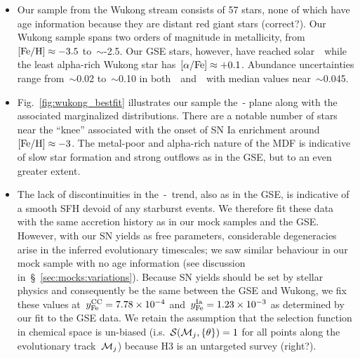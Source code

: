 \documentclass[ms.tex]{subfiles}
\begin{document}
\begin{itemize}

	\item Our sample from the Wukong stream consists of 57 stars, none of which
	have age information because they are distant red giant stars {\color{red}
	(correct?)}.
	Our Wukong sample spans two orders of magnitude in metallicity,
	from~$\text{[Fe/H]} \approx -3.5$ to~$\sim$-2.5.
	Our GSE stars, however, have reached solar~\afe~while the least alpha-rich
	Wukong star has~$\text{[$\alpha$/Fe]} \approx +0.1$.
	Abundance uncertainties range from~$\sim$0.02 to~$\sim$0.10 in
	both~\afe~and~\feh~with median values near~$\sim$0.045.

	\item Fig.~\ref{fig:wukong_bestfit} illustrates our sample the~\afe-\feh
	plane along with the associated marginalized distributions.
	There are a notable number of stars near the ``knee'' associated with the
	onset of SN Ia enrichment around~$\text{[Fe/H]} \approx -3$.
	The metal-poor and alpha-rich nature of the MDF is indicative of slow
	star formation and strong outflows as in the GSE, but to an even greater
	extent.

	\item The lack of discontinuities in the~\afe-\feh~trend, also as in the
	GSE, is indicative of a smooth SFH devoid of any starburst events.
	We therefore fit these data with the same accretion history as in our
	mock samples and the GSE.
	However, with our SN yields as free parameters, considerable degeneracies
	arise in the inferred evolutionary timescales; we saw similar behaviour in
	our mock sample with no age information (see discussion
	in~\S~\ref{sec:mocks:variations}).
	Because SN yields should be set by stellar physics and consequently be the
	same between the GSE and Wukong, we fix these values
	at~$y_\text{Fe}^\text{CC} = 7.78\times10^{-4}$ and~$y_\text{Fe}^\text{Ia} = 1.23\times10^{-3}$ as
	determined by our fit to the GSE data.
	We retain the assumption that the selection function in chemical space is
	un-biased (i.s.~$\mathcal{S}(\mathcal{M}_j, \{\theta\}) = 1$ for all points
	along the evolutionary track~$\mathcal{M}_j$) because H3 is an untargeted
	survey {\color{red} (right?)}.


\end{itemize}
\end{document}
